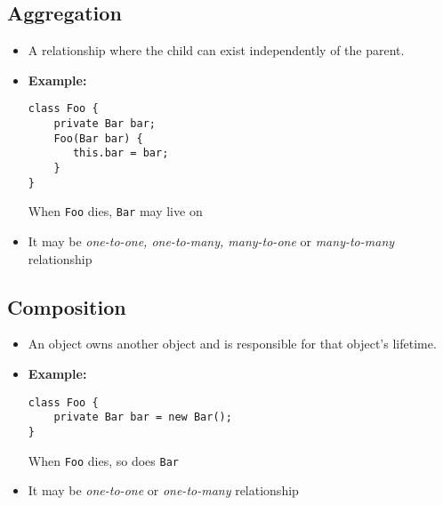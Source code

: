 \documentclass[12pt]{article}
\begin{document}
\subsection{Aggregation}
\begin{itemize}
    \item  A relationship where the child can exist independently of the parent.
    \item \textbf{Example:}
          \begin{lstlisting}
class Foo {
    private Bar bar;
    Foo(Bar bar) {
       this.bar = bar;
    }
}
          \end{lstlisting}
          When \lstinline|Foo| dies, \lstinline|Bar| may live on
          \item It may be \textit{one-to-one, one-to-many, many-to-one} or \textit{many-to-many} relationship
\end{itemize}
\subsection{Composition}
\begin{itemize}
    \item An object owns another object and is responsible for that object's lifetime.
    \item \textbf{Example:}
          \begin{lstlisting}
class Foo {
    private Bar bar = new Bar();
}
          \end{lstlisting}
          When \lstinline|Foo| dies, so does \lstinline|Bar|
          \item It may be \textit{one-to-one} or \textit{one-to-many} relationship
\end{itemize}
\newpage
\printindex
\end{document}
